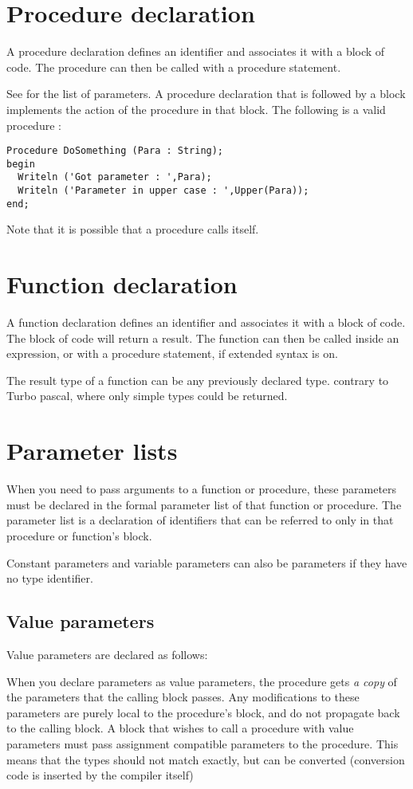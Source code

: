 \documentclass{report}
\begin{document}
\section{Procedure declaration}
A procedure declaration defines an identifier and associates it with a
block of code. The procedure can then be called with a procedure statement.

See  for the list of parameters.
A procedure declaration that is followed by a block implements the action of
the procedure in that block.
The following is a valid procedure :
\begin{verbatim}
Procedure DoSomething (Para : String);
begin
  Writeln ('Got parameter : ',Para);
  Writeln ('Parameter in upper case : ',Upper(Para));
end;
\end{verbatim}
Note that it is possible that a procedure calls itself.

\section{Function declaration}
A function declaration defines an identifier and associates it with a
block of code. The block of code will return a result.
The function can then be called inside an expression, or with a procedure
statement, if extended syntax is on.

The result type of a function can be any previously declared type.
contrary to Turbo pascal, where only simple types could be returned.

\section{Parameter lists}
\label{se:Parameters}
When you need to pass arguments to a function or procedure, these parameters
must be declared in the formal parameter list of that function or procedure.
The parameter list is a declaration of identifiers that can be referred to
only in that procedure or function's block.

Constant parameters and variable parameters can also be 
parameters if they have no type identifier.
\subsection{Value parameters}
Value parameters are declared as follows:

When you declare parameters as value parameters, the procedure gets {\em
a copy} of the parameters that the calling block passes. Any modifications
to these parameters are purely local to the procedure's block, and do not
propagate back to the calling block.
A block that wishes to call a procedure with value parameters must pass
assignment compatible parameters to the procedure. This means that the types
should not match exactly, but can be converted (conversion code is inserted
by the compiler itself)
\end{document}
